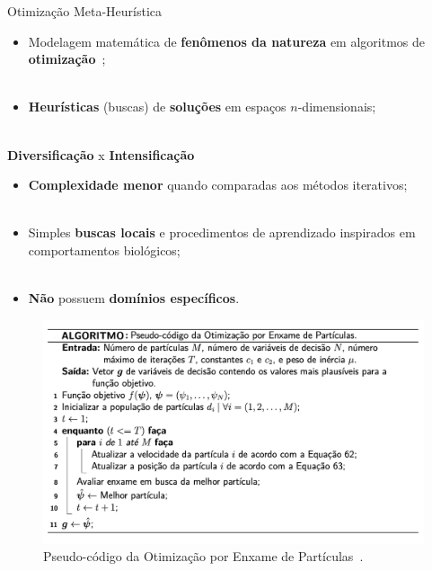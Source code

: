 \begin{frame}{Otimização Meta-Heurística}
	\begin{itemize}
		\justifying
		\item Modelagem matemática de \textbf{fenômenos da natureza} em algoritmos de \textbf{otimização}~\cite{yang_review};
		\\~\\
		\item \textbf{Heurísticas} (buscas) de \textbf{soluções} em espaços $n$-dimensionais;
		\\~\\
	\end{itemize}
	\vspace*{0.5cm}
	\begin{block}{}
		\centering
		\textbf{Diversificação} x \textbf{Intensificação}
	\end{block}	
\end{frame}

\begin{frame}
	\begin{itemize}
		\justifying
		\item \textbf{Complexidade menor} quando comparadas aos métodos iterativos;
		\\~\\
		\item Simples \textbf{buscas locais} e procedimentos de aprendizado inspirados em comportamentos biológicos;
		\\~\\
		\item \textbf{Não} possuem \textbf{domínios específicos}.
	\end{itemize}
\end{frame}

\begin{frame}
	\begin{figure}
		\centering
		\includegraphics[scale=0.375]{figs/pso.png}	
		\caption{Pseudo-código da Otimização por Enxame de Partículas~\cite{Kennedy:01}.}
		\label{f.pso}
	\end{figure}
\end{frame}